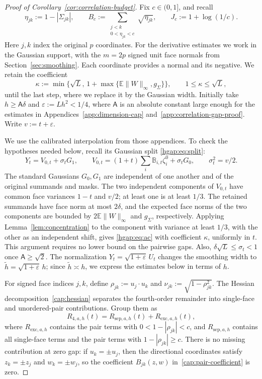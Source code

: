 \documentclass[11pt,letterpaper]{article}
\theoremstyle{remark}
\newcommand{\E}{\mathbb E}
\begin{document}
\begin{proof}[Proof of Corollary~\ref{cor:correlation-budget}]
Fix $c\in(0,1]$, and recall
\[
 \eta_{jk}:=1-|\Sigma_{jk}|,\qquad
 B_c:=\sum_{\substack{j<k\\0<\eta_{jk}<c}}\sqrt{\eta_{jk}},
 \qquad J_c:=1+\log(1/c).
\]
Here $j,k$ index the original $p$ coordinates. For the derivative
estimates we work in the Gaussian support, with the $m=2p$ signed
unit face normals from Section~\ref{sec:smoothing}. Each coordinate
provides a normal and its negative. We retain the coefficient
\[
 \kappa:=\min\{\sqrt L,\,1+\max\{\E\|W\|_\infty,g_\Sigma\}\},
 \qquad 1\le\kappa\le\sqrt L,
\]
until the last step, where we replace it by the Gaussian width.
Initially take $h\ge\mathsf A\delta$ and $\varepsilon:=Lh^2<1/4$,
where $\mathsf A$ is an absolute constant large enough for the
estimates in Appendices~\ref{app:dimension-cap}
and~\ref{app:correlation-gap-proof}. Write $v:=t+\varepsilon$.

We use the calibrated interpolation from those appendices. To check
the hypotheses needed below, recall its Gaussian split
\eqref{hgap:eq:split}:
\[
 Y_t=V_{0,t}+\sigma_tG_1,\qquad
 V_{0,t}=(1+t)\sum_i\mathbb B_{i,t}\zeta_i^0+\sigma_tG_0,
 \qquad \sigma_t^2=v/2.
\]
The standard Gaussians $G_0,G_1$ are independent of one another and
of the original summands and masks. The two independent components
of $V_{0,t}$ have common face variances $1-t$ and $v/2$; at least one
is at least $1/3$. The retained summands have face norm at most
$2\delta$, and the expected face norms of the two components are
bounded by $2\E\|W\|_\infty$ and $g_\Sigma$, respectively.
Applying Lemma~\ref{lem:concentration} to the component with variance
at least $1/3$, with the other as an independent shift, gives
\eqref{hgap:eq:ac} with coefficient $\kappa$, uniformly in $t$.
This argument requires no lower bound on the pairwise gaps.
Also, $\delta\sqrt L\le\sigma_t<1$ once $\mathsf A\ge\sqrt2$.
The normalization $Y_t=\sqrt{1+\varepsilon}\,U_t$ changes the
smoothing width to $\widetilde h=\sqrt{1+\varepsilon}\,h$;
since $\widetilde h\asymp h$, we express the estimates below in
terms of $h$.

For signed face indices $j,k$, define
$\rho_{jk}:=u_j\cdot u_k$ and
$\nu_{jk}:=\sqrt{1-\rho_{jk}^2}$.
The Hessian decomposition~\eqref{cap:hessian} separates the
fourth-order remainder into single-face and unordered-pair
contributions. Group them as
\[
 R_{4,a,h}(t)=R_{\mathrm{sep},a,h}(t)+R_{\mathrm{exc},a,h}(t),
\]
where $R_{\mathrm{exc},a,h}$ contains the pair terms with
$0<1-|\rho_{jk}|<c$, and $R_{\mathrm{sep},a,h}$ contains all
single-face terms and the pair terms with $1-|\rho_{jk}|\ge c$.
There is no missing contribution at zero gap: if $u_k=\pm u_j$,
then the directional coordinates satisfy $z_k=\pm z_j$ and
$w_k=\pm w_j$, so the coefficient
$B_{jk}(z,w)$ in~\eqref{cap:pair-coefficient} is zero.


\end{proof}
\end{document}
